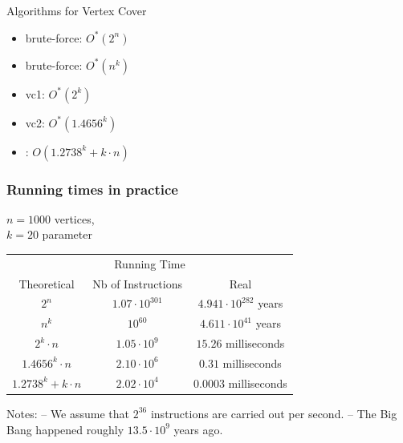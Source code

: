 \begin{frame}{Algorithms for Vertex Cover}

\begin{itemize}
 \item brute-force: $O^*(2^n)$
 \item brute-force: $O^*(n^k)$
 \item \textsf{vc1}: $O^*(2^k)$
 \item \textsf{vc2}: $O^*(1.4656^k)$
 \item \cite{ChenKX10}: $O(1.2738^k+k\cdot n)$ 
\end{itemize}

\end{frame}


\begin{frame}
  \frametitle{Running times in practice}
  \noindent
  $n = 1000$ vertices,\\
  $k = 20$ parameter\\
  \bigskip
  
  \begin{tabular}{c c c}
   \hline
   \multicolumn{3}{c}{Running Time}\\
   Theoretical & Nb of Instructions & Real\\
   \hline
   $2^n$ & $1.07 \cdot 10^{301}$ & $4.941 \cdot 10^{282}$ years\\
   $n^k$ & $10^{60}$  & $4.611 \cdot 10^{41}$  years\\
   $2^k \cdot n$ & $1.05 \cdot 10^9$ & $15.26$ milliseconds\\
   $1.4656^k \cdot n$ & $2.10 \cdot 10^6$ & $0.31$ milliseconds\\
   $1.2738^k + k\cdot n$ & $2.02 \cdot 10^4$ & $0.0003$ milliseconds\\
   \hline
  \end{tabular}

  \bigskip
  \noindent
  Notes:\newline
  -- We assume that $2^{36}$ instructions are carried out per second.\newline
  -- The Big Bang happened roughly $13.5\cdot 10^9$ years ago.
\end{frame}

